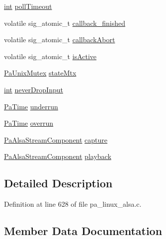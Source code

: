 \begin{DoxyCompactItemize}
\item 
\hyperlink{xmltok_8h_a5a0d4a5641ce434f1d23533f2b2e6653}{int} \hyperlink{struct_pa_alsa_stream_afd9058a227a6b8d8eae41f033c7955ae}{poll\+Timeout}
\item 
volatile sig\+\_\+atomic\+\_\+t \hyperlink{struct_pa_alsa_stream_a118a04f7270ac45c669d5cec7a410119}{callback\+\_\+finished}
\item 
volatile sig\+\_\+atomic\+\_\+t \hyperlink{struct_pa_alsa_stream_ab572de6c0a951967b3a47713427858d3}{callback\+Abort}
\item 
volatile sig\+\_\+atomic\+\_\+t \hyperlink{struct_pa_alsa_stream_a6bd474f11d49f98eb08f0558b17b5cd3}{is\+Active}
\item 
\hyperlink{struct_pa_unix_mutex}{Pa\+Unix\+Mutex} \hyperlink{struct_pa_alsa_stream_aba5481778876188e52785adf8e0ce793}{state\+Mtx}
\item 
\hyperlink{xmltok_8h_a5a0d4a5641ce434f1d23533f2b2e6653}{int} \hyperlink{struct_pa_alsa_stream_ac0213bb3155e96b4445af2ccbc6c6641}{never\+Drop\+Input}
\item 
\hyperlink{portaudio_8h_af17a7e6d0471a23071acf8dbd7bbe4bd}{Pa\+Time} \hyperlink{struct_pa_alsa_stream_a1158444fe763d7def459e7e7d99bedb1}{underrun}
\item 
\hyperlink{portaudio_8h_af17a7e6d0471a23071acf8dbd7bbe4bd}{Pa\+Time} \hyperlink{struct_pa_alsa_stream_a3a8accd426fdfb836f6e692648ced93e}{overrun}
\item 
\hyperlink{struct_pa_alsa_stream_component}{Pa\+Alsa\+Stream\+Component} \hyperlink{struct_pa_alsa_stream_ad8d739f23295022c802125ef47c142cd}{capture}
\item 
\hyperlink{struct_pa_alsa_stream_component}{Pa\+Alsa\+Stream\+Component} \hyperlink{struct_pa_alsa_stream_a82ea139e41016b139932dbf649c30741}{playback}
\end{DoxyCompactItemize}


\subsection{Detailed Description}


Definition at line 628 of file pa\+\_\+linux\+\_\+alsa.\+c.



\subsection{Member Data Documentation}
